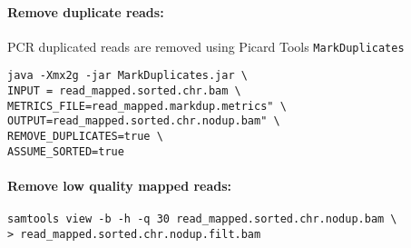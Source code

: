 \documentclass[10pt]{article}
\newcommand{\prog}[1]{\texttt{#1}}
\begin{document}
\paragraph{Remove duplicate reads:} PCR duplicated reads are removed using Picard Tools \prog{MarkDuplicates}
\begin{verbatim}
java -Xmx2g -jar MarkDuplicates.jar \
INPUT = read_mapped.sorted.chr.bam \
METRICS_FILE=read_mapped.markdup.metrics" \
OUTPUT=read_mapped.sorted.chr.nodup.bam" \
REMOVE_DUPLICATES=true \
ASSUME_SORTED=true
\end{verbatim}
\paragraph{Remove low quality mapped reads:}
\begin{verbatim}
samtools view -b -h -q 30 read_mapped.sorted.chr.nodup.bam \
> read_mapped.sorted.chr.nodup.filt.bam

\end{verbatim}
\end{document}
